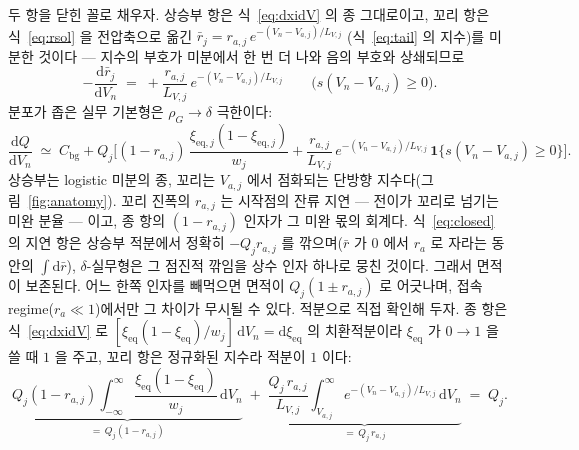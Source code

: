 \documentclass[11pt,a4paper]{article}
\newcommand{\dd}{\mathrm{d}}
\newcommand{\eq}{\mathrm{eq}}
\newcommand{\bg}{\mathrm{bg}}
\begin{document}
두 항을 닫힌 꼴로 채우자. 상승부 항은 식~\eqref{eq:dxidV} 의 종 그대로이고, 꼬리 항은
식~\eqref{eq:rsol} 을 전압축으로 옮긴 $\bar r_j=r_{a,j}\,e^{-(V_n-V_{a,j})/L_{V,j}}$
(식~\eqref{eq:tail} 의 지수)를 미분한 것이다 — 지수의 부호가 미분에서 한 번 더 나와 음의 부호와
상쇄되므로
\begin{equation}
-\frac{\dd\bar r_j}{\dd V_n}\;=\;+\frac{r_{a,j}}{L_{V,j}}\,e^{-(V_n-V_{a,j})/L_{V,j}}
\qquad\big(s(V_n-V_{a,j})\ge0\big).
\label{eq:taildiff}
\end{equation}
분포가 좁은 실무 기본형은 $\rho_G\to\delta$ 극한이다:
\begin{equation}
\frac{\dd Q}{\dd V_n}\;\simeq\;C_\bg+Q_j\bigg[
(1-r_{a,j})\,\frac{\xi_{\eq,j}(1-\xi_{\eq,j})}{w_j}
+\frac{r_{a,j}}{L_{V,j}}\,e^{-(V_n-V_{a,j})/L_{V,j}}\,\mathbf 1\{s(V_n-V_{a,j})\ge0\}\bigg].
\label{eq:simplefit}
\end{equation}
상승부는 logistic 미분의 종, 꼬리는 $V_{a,j}$ 에서 점화되는 단방향 지수다(그림~\ref{fig:anatomy}). 꼬리
진폭의 $r_{a,j}$ 는 시작점의 잔류 지연 — 전이가 꼬리로 넘기는 미완 분율 — 이고, 종 항의
$(1-r_{a,j})$ 인자가 그 미완 몫의 회계다. 식~\eqref{eq:closed} 의 지연 항은 상승부 적분에서 정확히
$-Q_jr_{a,j}$ 를 깎으며($\bar r$ 가 $0$ 에서 $r_{a}$ 로 자라는 동안의 $\int\dd\bar r$), $\delta$-실무형은
그 점진적 깎임을 상수 인자 하나로 뭉친 것이다. 그래서 면적이 보존된다. 어느 한쪽 인자를 빼먹으면 면적이 $Q_j(1\pm r_{a,j})$ 로 어긋나며,
접속 regime($r_a\ll1$)에서만 그 차이가 무시될 수 있다. 적분으로 직접 확인해 두자. 종 항은
식~\eqref{eq:dxidV} 로 $[\xi_{\eq}(1-\xi_{\eq})/w_j]\,\dd V_n=\dd\xi_{\eq}$ 의 치환적분이라
$\xi_{\eq}$ 가 $0\to1$ 을 쓸 때 $1$ 을 주고, 꼬리 항은 정규화된 지수라 적분이 $1$ 이다:
\begin{equation}
\underbrace{Q_j(1-r_{a,j})\!\int_{-\infty}^{\infty}\!
\frac{\xi_{\eq}(1-\xi_{\eq})}{w_j}\,\dd V_n}_{=\,Q_j(1-r_{a,j})}
\;+\;
\underbrace{\frac{Q_j\,r_{a,j}}{L_{V,j}}\!\int_{V_{a,j}}^{\infty}\!
e^{-(V_n-V_{a,j})/L_{V,j}}\,\dd V_n}_{=\,Q_j\,r_{a,j}}
\;=\;Q_j.
\label{eq:areacons}
\end{equation}
\end{document}
